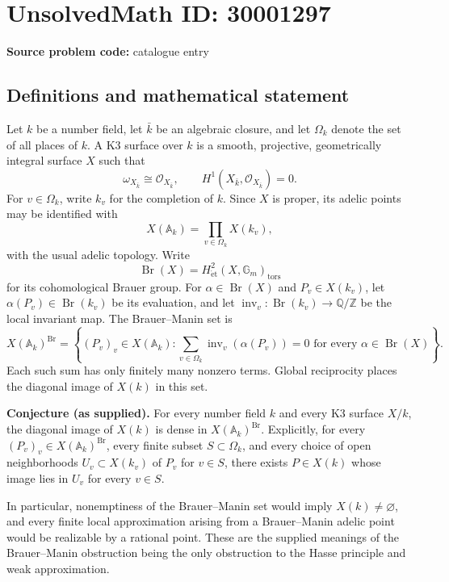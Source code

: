 \documentclass[11pt]{article}
\begin{document}
\section*{UnsolvedMath ID: 30001297}
\textbf{Source problem code:} catalogue entry
\subsection{Definitions and mathematical statement}
Let \(k\) be a number field, let \(\bar k\) be an algebraic closure, and let \(\Omega_k\) denote the set of all places of \(k\). A K3 surface over \(k\) is a smooth, projective, geometrically integral surface \(X\) such that
\[
\omega_{X_{\bar k}}\cong\mathcal O_{X_{\bar k}},\qquad H^1(X_{\bar k},\mathcal O_{X_{\bar k}})=0.
\]
For \(v\in\Omega_k\), write \(k_v\) for the completion of \(k\). Since \(X\) is proper, its adelic points may be identified with
\[
X(\mathbb A_k)=\prod_{v\in\Omega_k}X(k_v),
\]
with the usual adelic topology. Write
\[
\operatorname{Br}(X)=H^2_{\mathrm{\acute et}}(X,\mathbb G_m)_{\mathrm{tors}}
\]
for its cohomological Brauer group. For \(\alpha\in\operatorname{Br}(X)\) and \(P_v\in X(k_v)\), let \(\alpha(P_v)\in\operatorname{Br}(k_v)\) be its evaluation, and let \(\operatorname{inv}_v:\operatorname{Br}(k_v)\to\mathbb Q/\mathbb Z\) be the local invariant map. The Brauer--Manin set is
\[
X(\mathbb A_k)^{\operatorname{Br}}=
\left\{(P_v)_v\in X(\mathbb A_k):
\sum_{v\in\Omega_k}\operatorname{inv}_v(\alpha(P_v))=0
\text{ for every }\alpha\in\operatorname{Br}(X)\right\}.
\]
Each such sum has only finitely many nonzero terms. Global reciprocity places the diagonal image of \(X(k)\) in this set.

\textbf{Conjecture (as supplied).} For every number field \(k\) and every K3 surface \(X/k\), the diagonal image of \(X(k)\) is dense in \(X(\mathbb A_k)^{\operatorname{Br}}\). Explicitly, for every \((P_v)_v\in X(\mathbb A_k)^{\operatorname{Br}}\), every finite subset \(S\subset\Omega_k\), and every choice of open neighborhoods \(U_v\subset X(k_v)\) of \(P_v\) for \(v\in S\), there exists \(P\in X(k)\) whose image lies in \(U_v\) for every \(v\in S\).

In particular, nonemptiness of the Brauer--Manin set would imply \(X(k)\ne\varnothing\), and every finite local approximation arising from a Brauer--Manin adelic point would be realizable by a rational point. These are the supplied meanings of the Brauer--Manin obstruction being the only obstruction to the Hasse principle and weak approximation.
\end{document}
